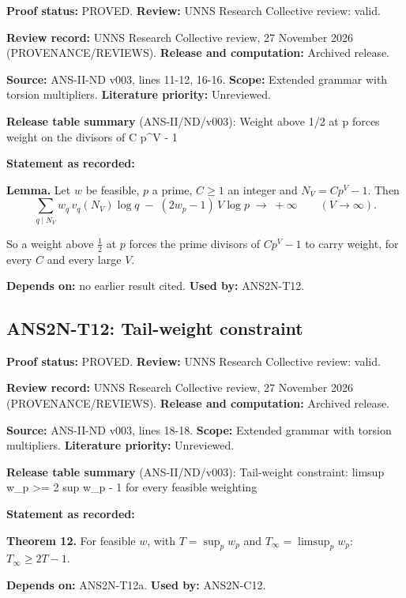 \documentclass[
  11pt,
]{article}
\begin{document}
\textbf{Proof status:} PROVED. \textbf{Review:} UNNS Research Collective
review: valid.

\textbf{Review record:} UNNS Research Collective review, 27 November
2026 (PROVENANCE/REVIEWS). \textbf{Release and computation:} Archived
release.

\textbf{Source:} ANS-II-ND v003, lines 11-12, 16-16. \textbf{Scope:}
Extended grammar with torsion multipliers. \textbf{Literature priority:}
Unreviewed.

\textbf{Release table summary} (ANS-II/ND/v003): Weight above 1/2 at p
forces weight on the divisors of C p\^{}V - 1

\textbf{Statement as recorded:}

\textbf{Lemma.} Let \(w\) be feasible, \(p\) a prime, \(C\ge1\) an
integer and \(N_V=Cp^V-1\). Then
\[\sum_{q\mid N_V}w_q\,v_q(N_V)\log q\;-\;(2w_p-1)\,V\log p\;\longrightarrow\;+\infty\qquad(V\to\infty).\]

So a weight above \(\frac12\) at \(p\) forces the prime divisors of
\(Cp^V-1\) to carry weight, for every \(C\) and every large \(V\).

\textbf{Depends on:} no earlier result cited. \textbf{Used by:}
ANS2N-T12.

\hypertarget{ans2n-t12-tail-weight-constraint}{%
\subsection{ANS2N-T12: Tail-weight
constraint}\label{ans2n-t12-tail-weight-constraint}}

\textbf{Proof status:} PROVED. \textbf{Review:} UNNS Research Collective
review: valid.

\textbf{Review record:} UNNS Research Collective review, 27 November
2026 (PROVENANCE/REVIEWS). \textbf{Release and computation:} Archived
release.

\textbf{Source:} ANS-II-ND v003, lines 18-18. \textbf{Scope:} Extended
grammar with torsion multipliers. \textbf{Literature priority:}
Unreviewed.

\textbf{Release table summary} (ANS-II/ND/v003): Tail-weight constraint:
limsup w\_p \textgreater= 2 sup w\_p - 1 for every feasible weighting

\textbf{Statement as recorded:}

\textbf{Theorem 12.} For feasible \(w\), with \(T=\sup_pw_p\) and
\(T_\infty=\limsup_pw_p\): \(T_\infty\ge2T-1\).

\textbf{Depends on:} ANS2N-T12a. \textbf{Used by:} ANS2N-C12.
\end{document}
